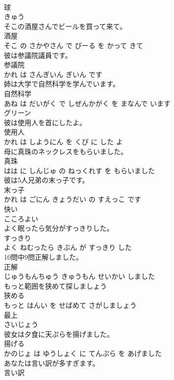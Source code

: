 \documentclass[8pt]{extreport}
\begin{document}
\begin{CJK}{UTF8}{min}
\\	球	
\\	きゅう			
\\	そこの酒屋さんでビールを買って来て。	
\\	酒屋 
\\	そこ の さかやさん で びーる を かって きて			
\\	彼は参議院議員です。	
\\	参議院 
\\	かれ は さんぎいん ぎいん です			
\\	姉は大学で自然科学を学んでいます。	
\\	自然科学 
\\	あね は だいがく で しぜんかがく を まなんで います			
\\	グリーン	
\\	彼は使用人を首にしたよ。	
\\	使用人 
\\	かれ は しようにん を くび に した よ			
\\	母に真珠のネックレスをもらいました。	
\\	真珠 
\\	はは に しんじゅ の ねっくれす を もらいました			
\\	彼は5人兄弟の末っ子です。	
\\	末っ子 
\\	かれ は ごにん きょうだい の すえっこ です			
\\	快い	
\\	こころよい			
\\	よく眠ったら気分がすっきりした。	
\\	すっきり 
\\	よく ねむったら きぶん が すっきり した			
\\	10問中9問正解しました。	
\\	正解 
\\	じゅうもんちゅう きゅうもん せいかい しました			
\\	もっと範囲を狭めて探しましょう	
\\	狭める 
\\	もっと はんい を せばめて さがしましょう			
\\	最上	
\\	さいじょう			
\\	彼女は夕食に天ぷらを揚げました。	
\\	揚げる 
\\	かのじょ は ゆうしょく に てんぷら を あげました			
\\	あなたは言い訳が多すぎます。	
\\	言い訳 

\end{CJK}
\end{document}

